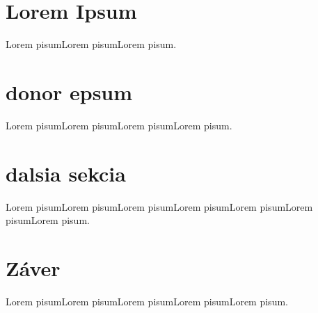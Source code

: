 \documentclass[12pt,oneside,slovak,a4paper]{article}
\begin{document}
\section{Lorem Ipsum}
Lorem pisumLorem pisumLorem pisum.

\section{donor epsum}
Lorem pisumLorem pisumLorem pisumLorem pisum.

\section{dalsia sekcia}
Lorem pisumLorem pisumLorem pisumLorem pisumLorem pisumLorem pisumLorem pisum.

\section{Záver}
Lorem pisumLorem pisumLorem pisumLorem pisumLorem pisum.



\end{document}
